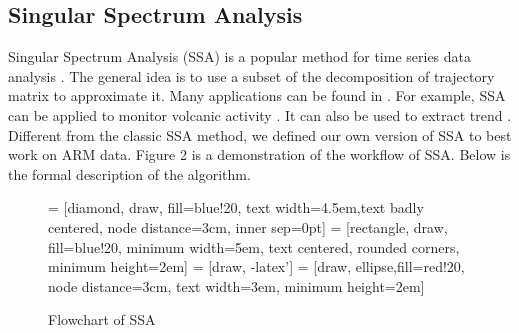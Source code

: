 \documentclass[letterpaper, 10 pt, conference]{ieeeconf}  %
\begin{document}
\subsection{Singular Spectrum Analysis}
Singular Spectrum Analysis (SSA) is a popular method for time series data analysis \cite{golyandina2013singular, golyandina2014basic}. The general idea is to use a subset of the decomposition of trajectory matrix to approximate it. Many applications can be found in \cite{golyandina2013singular}. For example, SSA can be applied to monitor volcanic activity \cite{bozzo2010relationship}. It can also be used to extract trend \cite{alexandrov2008method}. Different from the classic SSA method, we defined our own version of SSA to best work on ARM data. Figure 2 is a demonstration of the workflow of SSA. Below is the formal description of the algorithm.

\begin{figure}[ht]
    \centering
     = [diamond, draw, fill=blue!20, text width=4.5em,text badly centered, node distance=3cm, inner sep=0pt]
     = [rectangle, draw, fill=blue!20, minimum width=5em, text centered, rounded corners, minimum height=2em]
     = [draw, -latex']
     = [draw, ellipse,fill=red!20, node distance=3cm, text width=3em, minimum height=2em]
    \caption{Flowchart of SSA}
    \label{fig:pcs}
\end{figure}
\end{document}
